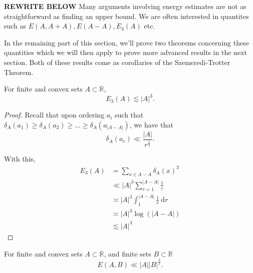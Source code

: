 \documentclass[12pt,reqno]{amsart}
\begin{document}
\textbf{REWRITE BELOW}
Many arguments involving energy estimates are not as straightforward
as finding an upper bound. We are often interested in quantites such as 
\(E(A,A + A), E(A - A), E_{3} (A)\) etc.

In the remaining part of this section, we'll prove two theorems concerning these quantities
which we will then apply to prove more advanced results in the next section. Both of these
results come as corollaries of the Szemeredi-Trotter Theorem.

\begin{theorem}
For finite and convex sets \(A \subset \mathbb{R} \),
\[
    E_{3} (A) \lesssim  \left\lvert A \right\rvert ^{ 3}
.\]
\end{theorem}

\begin{proof}
Recall that upon ordering \(a_{i} \) such that \(\delta_A(a_1) \geq \delta_A(a_2) \geq \dots \geq \delta_{A} (a_{\left\lvert A-A \right\rvert } )\),
we have that
\[
    \delta_{A} (a_{r} ) \ll \frac{\left\lvert A \right\rvert }{r^{\frac{1}{3} }}
.\]

With this,
\begin{align*}
E_3(A) & = \sum _{x \in A-A} \delta_{A} (x)^{3} \\
& \ll \left\lvert A \right\rvert ^{3} \sum_{r=1}^{\left\lvert A-A \right\rvert } \frac{1}{r}\\
& \asymp \left\lvert A \right\rvert ^{3} \int_{1}^{\left\lvert A-A \right\rvert } \frac{1}{r}  ~\mathrm{d} r \\
& \asymp  \left\lvert A \right\rvert ^{3} \log \left( \left\lvert A-A \right\rvert  \right) \\
& \lesssim  \left\lvert A \right\rvert ^{3}
\end{align*}
\end{proof}

\begin{theorem} \label{thm:szt-energy-convex-and-arbitrary}
For finite and convex sets \(A \subset \mathbb{R} \), and finite sets \(B \subset \mathbb{R} \)
\[
    E(A,B) \ll \left\lvert A \right\rvert \left\lvert B \right\rvert ^{\frac{3}{2} }
.\]
\end{theorem}
\end{document}
